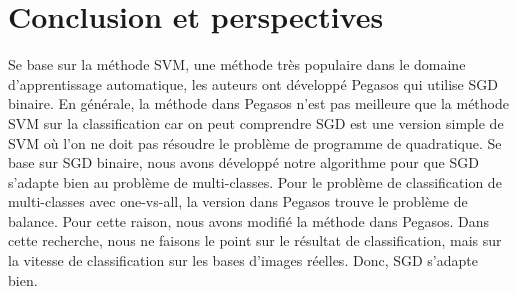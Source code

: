 \chapter{Conclusion et perspectives}
\label{chap:con}

Se base sur la méthode SVM, une méthode très populaire dans le domaine d'apprentissage automatique, les auteurs ont développé Pegasos \cite{sss07} qui utilise SGD binaire. En générale, la méthode dans Pegasos n'est pas meilleure que la méthode SVM sur la classification car on peut comprendre SGD est une version simple de SVM où l'on ne doit pas résoudre le problème de programme de quadratique. Se base sur SGD binaire, nous avons développé notre algorithme pour que SGD s'adapte bien au problème de multi-classes. Pour le problème de classification de multi-classes avec one-vs-all, la version dans Pegasos trouve le problème de balance. Pour cette raison, nous avons modifié la méthode dans Pegasos. Dans cette recherche, nous ne faisons le point sur le résultat de classification, mais sur la vitesse de classification sur les bases d'images réelles. Donc, SGD s'adapte bien.\\